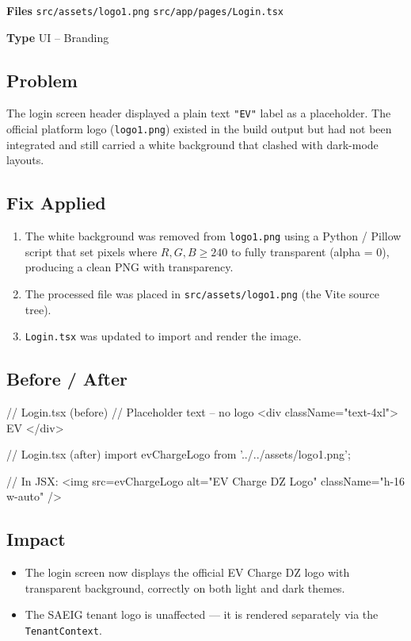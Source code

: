 \documentclass[12pt,a4paper]{report}
\newcommand{\diffL}{\noindent\begin{minipage}[t]{0.485\linewidth}}
\newcommand{\diffR}{\end{minipage}\hfill\begin{minipage}[t]{0.485\linewidth}}
\newcommand{\diffend}{\end{minipage}\par\smallskip}
\newcommand{\inforow}[2]{%
	\noindent
	\begin{tcolorbox}[
		colback   = lightblue,
		colframe  = midblue,
		arc       = 2pt,
		left      = 6pt, right = 6pt, top = 2pt, bottom = 2pt,
		sidebyside, sidebyside align = top seam,
		lefthand width = 3.2cm,
		segmentation hidden,
		]
		\textbf{\color{brandblue}\small #1}
		\tcblower
		{\small\color{labelgray} #2}
	\end{tcolorbox}\vspace{2pt}%
}
\newcommand{\file}[1]{\texttt{\small #1}}
\begin{document}
	\inforow{Files}{\file{src/assets/logo1.png} \quad \file{src/app/pages/Login.tsx}}
	\inforow{Type}{UI -- Branding}

	\subsection*{Problem}

	The login screen header displayed a plain text \texttt{"EV"} label
	as a placeholder. The official platform logo (\texttt{logo1.png})
	existed in the build output but had not been integrated and still
	carried a white background that clashed with dark-mode layouts.

	\subsection*{Fix Applied}

	\begin{enumerate}
		\item The white background was removed from \texttt{logo1.png} using a
		      Python / Pillow script that set pixels where \(R, G, B \geq 240\)
		      to fully transparent (alpha = 0), producing a clean PNG with
		      transparency.
		\item The processed file was placed in
		      \texttt{src/assets/logo1.png} (the Vite source tree).
		\item \texttt{Login.tsx} was updated to import and render the image.
	\end{enumerate}

	\subsection*{Before / After}

	\diffL
	\begin{beforecode}
// Login.tsx (before)
// Placeholder text -- no logo
<div className="text-4xl">
  EV
</div>
	\end{beforecode}
	\diffR
	\begin{aftercode}
// Login.tsx (after)
import evChargeLogo
  from '../../assets/logo1.png';

// In JSX:
<img
  src={evChargeLogo}
  alt="EV Charge DZ Logo"
  className="h-16 w-auto"
/>
	\end{aftercode}
	\diffend

	\subsection*{Impact}
	\begin{itemize}
		\item The login screen now displays the official EV Charge DZ logo with transparent background, correctly on both light and dark themes.
		\item The SAEIG tenant logo is unaffected --- it is rendered separately via the \texttt{TenantContext}.
	\end{itemize}
\end{document}
